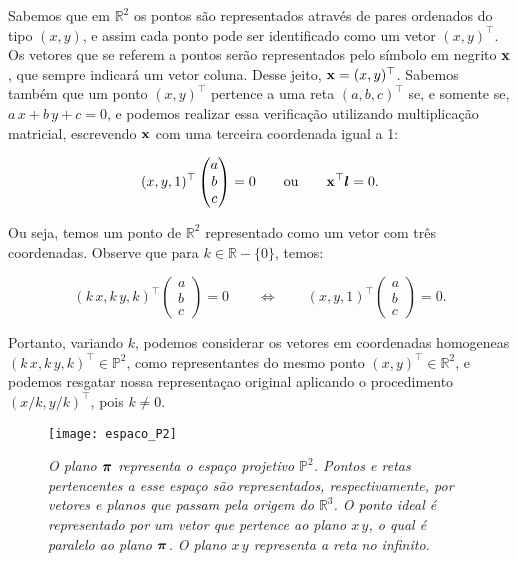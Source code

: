 

Sabemos que em $\mathbb{R}^{2}$ os pontos são representados através de pares ordenados do tipo $(x,y)$, e assim cada ponto pode ser identificado como um vetor $(x,y)^\top$. Os vetores que se referem a pontos serão representados pelo símbolo em negrito $\mathbf{x}$, que sempre indicará um vetor coluna. Desse jeito, $\mathbf{x}=(x,y)^\top$. Sabemos também que um ponto $(x,y)^\top$ pertence a uma reta $(a,b,c)^\top$ se, e somente se, $a\,x+b\,y+c=0$, e podemos realizar essa verificação utilizando multiplicação matricial, escrevendo $\mathbf{x}$ com uma terceira coordenada igual a 1:

\begin{equation*}
(x,y,1)^\top 
\begin{pmatrix}
 a  \\ 
 b  \\ 
 c 
 \end{pmatrix} 
 = 0 \qquad 
 \text{ou} 
 \qquad \mathbf{x} ^\top\boldsymbol{l} = 0.
\end{equation*}

Ou seja, temos um ponto de $\mathbb{R}^{2}$ representado como um vetor com três coordenadas. Observe que para $k \in \mathbb{R} - \{0\}$, temos:

\begin{equation*}
(k\,x,k\,y,k)^\top 
\begin{pmatrix}
 a  \\ 
 b  \\ 
 c 
 \end{pmatrix} 
 = 0
 \qquad \Leftrightarrow \qquad
 (x,y,1)^\top
\begin{pmatrix}
 a  \\ 
 b  \\ 
 c 
 \end{pmatrix} 
 = 0.
\end{equation*}

Portanto,  variando $k$, podemos considerar os vetores em coordenadas homogeneas $(k\,x,k\,y,k)^\top \in \mathbb{P}^2$, como representantes do mesmo ponto $(x,y)^\top \in \mathbb{R}^2$, e podemos resgatar nossa representaçao original aplicando o procedimento $(x/k,y/k)^\top$, pois $k \ne 0$.

\begin{figure}[!htb]
\centering
\texttt{[image: espaco\_P2]}
\caption{\textit{O plano $\boldsymbol{\pi}$ representa o espaço projetivo $\mathbb{P}^2$. Pontos e retas pertencentes a esse espaço são representados, respectivamente, por vetores e planos que passam pela origem do $\mathbb{R}^3$. O ponto ideal é representado por um vetor que pertence ao plano $x\,y$, o qual é paralelo ao plano $\boldsymbol{\pi}$. O plano $x\,y$ representa a reta no infinito.}}
\label{plano_P2}
\end{figure}

